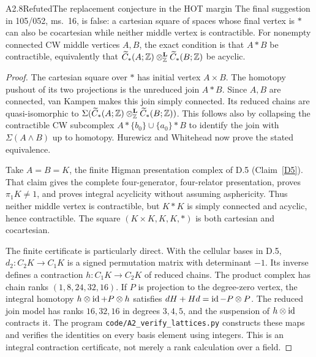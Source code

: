 \begin{claim}{A2.8}{Refuted}{The replacement conjecture in the HOT margin}
\label{A2-HOT-margin}
The final suggestion in 105/052, ms.~16, is false: a cartesian square of
spaces whose final vertex is $*$ can also be cocartesian while neither
middle vertex is contractible. For nonempty connected CW middle vertices
$A,B$, the exact condition is that $A*B$ be contractible, equivalently that
$\widetilde C_*(A;\mathbb Z)\otimes_{\mathbb Z}^{\mathbf L}\widetilde C_*(B;\mathbb Z)$ be acyclic.
\end{claim}
\begin{proof}
The cartesian square over $*$ has initial vertex $A\times B$. The homotopy
pushout of its two projections is the unreduced join $A*B$. Since $A,B$
are connected, van Kampen makes this join simply connected. Its reduced
chains are quasi-isomorphic to
$\Sigma(\widetilde C_*(A;\mathbb Z)\otimes_{\mathbb Z}^{\mathbf L}\widetilde C_*(B;\mathbb Z))$.
This follows also by collapsing the contractible CW subcomplex
$A*\{b_0\}\cup\{a_0\}*B$ to identify the join with $\Sigma(A\wedge B)$ up
to homotopy. Hurewicz and Whitehead now prove the stated equivalence.

Take $A=B=K$, the finite Higman presentation complex of D.5
(Claim~\ref{D5}). That claim gives the complete four-generator,
four-relator presentation, proves $\pi_1K\ne1$, and proves integral
acyclicity without assuming asphericity. Thus neither middle vertex is
contractible, but $K*K$ is simply connected and acyclic, hence contractible.
The square $(K\times K,K,K,*)$ is both cartesian and cocartesian.

The finite certificate is particularly direct. With the cellular bases in
D.5, $d_2:C_2K\to C_1K$ is a signed permutation matrix with determinant
$-1$. Its inverse defines a contraction $h:C_1K\to C_2K$ of reduced chains.
The product complex has chain ranks $(1,8,24,32,16)$. If $P$ is projection
to the degree-zero vertex, the integral homotopy
$h\otimes\operatorname{id}+P\otimes h$ satisfies $dH+Hd=\operatorname{id}-P\otimes P$.
The reduced join model has ranks $16,32,16$ in degrees $3,4,5$, and
the suspension of $h\otimes\operatorname{id}$ contracts it. The program
\texttt{code/A2\_verify\_lattices.py} constructs these maps and verifies the
identities on every basis element using integers. This is an integral
contraction certificate, not merely a rank calculation over a field.
\end{proof}

